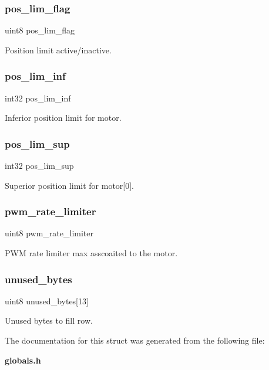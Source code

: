 \subsubsection{pos\+\_\+lim\+\_\+flag}
{\footnotesize\ttfamily uint8 pos\+\_\+lim\+\_\+flag}

Position limit active/inactive. \mbox{\label{structst__motor_a09aaaa265df5ea6cba5a3f216f1dc2c8}} 
\subsubsection{pos\+\_\+lim\+\_\+inf}
{\footnotesize\ttfamily int32 pos\+\_\+lim\+\_\+inf}

Inferior position limit for motor. \mbox{\label{structst__motor_a981b8ec7db1222b3afbd4f1fd5da983d}} 
\subsubsection{pos\+\_\+lim\+\_\+sup}
{\footnotesize\ttfamily int32 pos\+\_\+lim\+\_\+sup}

Superior position limit for motor[0]. \mbox{\label{structst__motor_a1230396f2894c516a42a418ec34a60a1}} 
\subsubsection{pwm\+\_\+rate\+\_\+limiter}
{\footnotesize\ttfamily uint8 pwm\+\_\+rate\+\_\+limiter}

P\+WM rate limiter max asscoaited to the motor. \mbox{\label{structst__motor_a4e06ed17adfb7c69cda82526f3b6def1}} 
\subsubsection{unused\+\_\+bytes}
{\footnotesize\ttfamily uint8 unused\+\_\+bytes[13]}

Unused bytes to fill row. 

The documentation for this struct was generated from the following file\+:\begin{DoxyCompactItemize}
\item 
\textbf{ globals.\+h}\end{DoxyCompactItemize}
